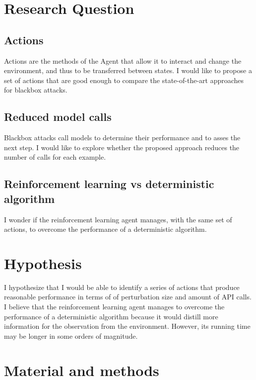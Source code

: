 \documentclass{article}
\begin{document}
\section{Research Question}
\subsection{Actions}
Actions are the methods of the Agent that allow it to interact and change the environment, and thus to be transferred between states. I would like to propose a set of actions that are good enough to compare the state-of-the-art approaches for blackbox attacks.

\subsection{Reduced model calls}
Blackbox attacks call models to determine their performance and to asses the next step. I would like to explore whether the proposed approach reduces the number of calls for each example.

\subsection{Reinforcement learning vs deterministic algorithm}
I wonder if the  reinforcement learning agent manages, with the same set of actions, to overcome the performance of a deterministic algorithm.

\section{Hypothesis}
I hypothesize that I would be able to identify a series of actions that produce reasonable performance in terms of  of perturbation size and amount of API calls.\\
I believe that the reinforcement learning agent manages to overcome the performance of a deterministic algorithm because it would distill more information for the observation from the environment. However, its running time may be longer in some orders of magnitude.

\section{Material and methods}
\end{document}
